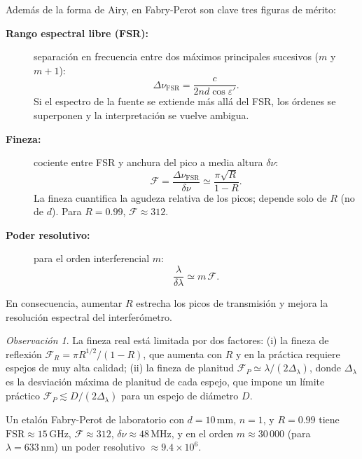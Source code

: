 \documentclass[12pt, a4paper]{article}
\theoremstyle{plain}
\theoremstyle{definition}
\theoremstyle{remark}
\newtheorem*{observacion}{Observación}
\begin{document}
Además de la forma de Airy, en Fabry-Perot son clave tres figuras de mérito:

\begin{description}
  \item[\textbf{Rango espectral libre (FSR):}] separación en frecuencia entre
        dos máximos principales sucesivos ($m$ y $m+1$):
\begin{equation}
  \Delta\nu_{\mathrm{FSR}}=\frac{c}{2nd\cos\varepsilon'}.
  \label{eq:fabry_fsr_t6}
\end{equation}
Si el espectro de la fuente se extiende más allá del FSR, los órdenes se
superponen y la interpretación se vuelve ambigua.

  \item[\textbf{Fineza:}] cociente entre FSR y anchura del pico a media
        altura $\delta\nu$:
\begin{equation}
  \mathcal{F}=\frac{\Delta\nu_{\mathrm{FSR}}}{\delta\nu}
  \simeq \frac{\pi\sqrt{R}}{1-R}.
  \label{eq:fabry_finesse_t6}
\end{equation}
La fineza cuantifica la agudeza relativa de los picos; depende solo de $R$
(no de $d$). Para $R = 0.99$, $\mathcal{F} \approx 312$.

  \item[\textbf{Poder resolutivo:}] para el orden interferencial $m$:
\begin{equation}
  \frac{\lambda}{\delta\lambda}\simeq m\,\mathcal{F}.
  \label{eq:fabry_res_t6}
\end{equation}
\end{description}

En consecuencia, aumentar $R$ estrecha los picos de transmisión y mejora la
resolución espectral del interferómetro.

\begin{observacion}
La fineza real está limitada por dos factores: (i) la fineza de reflexión
$\mathcal{F}_R = \pi R^{1/2}/(1-R)$, que aumenta con $R$ y en la práctica
requiere espejos de muy alta calidad; (ii) la fineza de planitud
$\mathcal{F}_P \simeq \lambda/(2\Delta_\lambda)$, donde $\Delta_\lambda$ es
la desviación máxima de planitud de cada espejo, que impone un límite
práctico $\mathcal{F}_P \lesssim D/(2\Delta_\lambda)$ para un espejo de
diámetro $D$.

Un etalón Fabry-Perot de laboratorio con $d = 10\,\text{mm}$, $n = 1$, y
$R = 0.99$ tiene $\text{FSR} \approx 15\,\text{GHz}$, $\mathcal{F} \approx
312$, $\delta\nu \approx 48\,\text{MHz}$, y en el orden $m \approx 30\,000$
(para $\lambda = 633\,\text{nm}$) un poder resolutivo $\approx 9.4 \times
10^6$.
\end{observacion}
\end{document}
